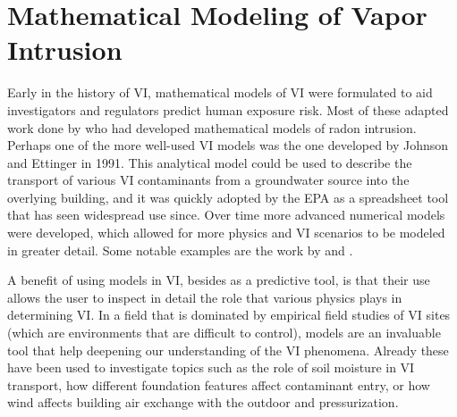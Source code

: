 \begin{comment}
Main point: Modeling is a useful tool for understanding the physical processes in VI.

- Mention some past use, advantages, and disadvantages. (Keep it brief and refer more to modeling chapter).
- Some examples again.

Mention in the end that we will use the model to investgiate some topics:
- Variability issue/ITS etc
- Mention sorption
\end{comment}


\section{Mathematical Modeling of Vapor Intrusion}\label{sec:intro_modeling}

Early in the history of VI, mathematical models of VI were formulated to aid investigators and regulators predict human exposure risk.
Most of these adapted work done by \citeauthor{nazaroff_predicting_1988}\cite{nazaroff_predicting_1988} who had developed mathematical models of radon intrusion.
Perhaps one of the more well-used VI models was the one developed by Johnson and Ettinger in 1991\cite{johnson_heuristic_1991}.
This analytical model could be used to describe the transport of various VI contaminants from a groundwater source into the overlying building, and it was quickly adopted by the EPA as a spreadsheet tool that has seen widespread use since\cite{u.s._environmental_protection_agency_oswer_2015}.
Over time more advanced numerical models were developed, which allowed for more physics and VI scenarios to be modeled in greater detail.
Some notable examples are the work by \citeauthor{abreu_effect_2005}\cite{abreu_effect_2005} and \citeauthor{pennell_development_2009}\cite{pennell_development_2009}.\par

A benefit of using models in VI, besides as a predictive tool, is that their use allows the user to inspect in detail the role that various physics plays in determining VI.
In a field that is dominated by empirical field studies of VI sites (which are environments that are difficult to control), models are an invaluable tool that help deepening our understanding of the VI phenomena.
Already these have been used to investigate topics such as the role of soil moisture in VI transport\cite{shen_influence_2013}, how different foundation features affect contaminant entry\cite{yao_simulating_2013}, or how wind affects building air exchange with the outdoor and pressurization\cite{shirazi_three-dimensional_2017}.\par

